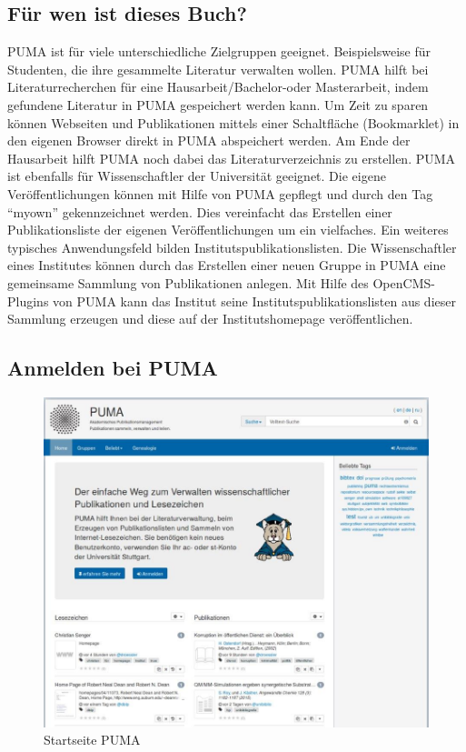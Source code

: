 \subsection{Für wen ist dieses Buch?}
PUMA ist für viele unterschiedliche Zielgruppen geeignet. Beispielsweise für Studenten, die ihre gesammelte Literatur verwalten wollen. PUMA hilft bei Literaturrecherchen für eine Hausarbeit/Bachelor-oder Masterarbeit, indem gefundene Literatur in PUMA gespeichert werden kann. Um Zeit zu sparen können Webseiten und Publikationen mittels einer Schaltfläche (Bookmarklet) in den eigenen Browser direkt in PUMA abspeichert werden. Am Ende der Hausarbeit hilft PUMA noch dabei das Literaturverzeichnis zu erstellen.
\newline 
PUMA ist ebenfalls für Wissenschaftler der Universität geeignet. Die eigene Veröffentlichungen können mit Hilfe von PUMA gepflegt und  durch den Tag \enquote{myown} gekennzeichnet werden. Dies vereinfacht das Erstellen einer Publikationsliste der eigenen Veröffentlichungen um ein vielfaches.
\newline Ein weiteres typisches Anwendungsfeld bilden Institutspublikationslisten. Die Wissenschaftler eines Institutes können durch das Erstellen einer neuen Gruppe in PUMA eine gemeinsame Sammlung von Publikationen anlegen. Mit Hilfe des OpenCMS-Plugins von PUMA kann das Institut seine Institutspublikationslisten aus dieser Sammlung erzeugen und diese auf der Institutshomepage veröffentlichen.

   
\subsection{Anmelden bei PUMA} 
\begin{figure}[ht]
 \centering
 \includegraphics[scale=0.25]{puma-001}
 \caption{Startseite PUMA}
 \label{figure1}
\end{figure}

